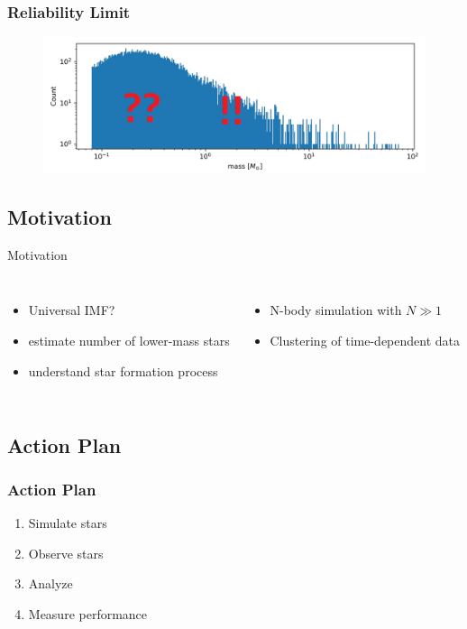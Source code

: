\documentclass{beamer}
\begin{document}
\begin{frame}
\frametitle{Reliability Limit}
  \begin{figure}
  \includegraphics[width=\linewidth]{Images/IMF2.jpg}
  \end{figure}
\end{frame}

\subsection{Motivation}

\begin{frame}
\begin{block}{Motivation}
	\begin{columns}[T]
	\vspace{0.5em}
	\begin{itemize}
	\item Universal IMF?
	\item estimate number of lower-mass stars
	\item understand star formation process
	\end{itemize}
	\vspace{0.5em}
	\begin{itemize}
	\item N-body simulation with \(N \gg 1\)
	\item Clustering of time-dependent data
	\end{itemize}
	\end{columns}
\end{block}
\end{frame}


\subsection{Action Plan}

\begin{frame}
\frametitle{Action Plan}
\begin{enumerate}
\item Simulate stars
\item Observe stars
\item Analyze
\item Measure performance
\end{enumerate}
\end{frame}
\end{document}
